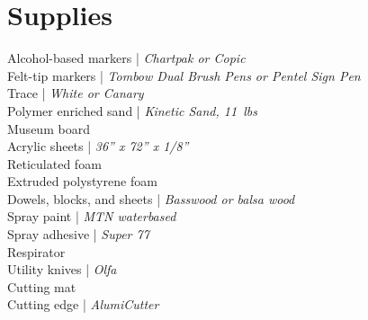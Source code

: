 \documentclass[11pt,article,oneside]{memoir}
\begin{document}
%
%
%
%
%
%
%
%
%
%

\section{Supplies}
Alcohol-based markers | \emph{Chartpak or Copic}\\
Felt-tip markers | \emph{Tombow Dual Brush Pens or Pentel Sign Pen}\\
Trace | \emph{White or Canary}\\
Polymer enriched sand | \emph{Kinetic Sand, 11~lbs}\\
Museum board\\
Acrylic sheets | \emph{36'' x 72'' x 1/8''}\\
Reticulated foam\\
Extruded polystyrene foam\\
Dowels, blocks, and sheets | \emph{Basswood or balsa wood}\\
Spray paint | \emph{MTN waterbased}\\
Spray adhesive | \emph{Super 77}\\
Respirator\\
Utility knives | \emph{Olfa}\\
Cutting mat\\
Cutting edge | \emph{AlumiCutter}\\
\end{document}
